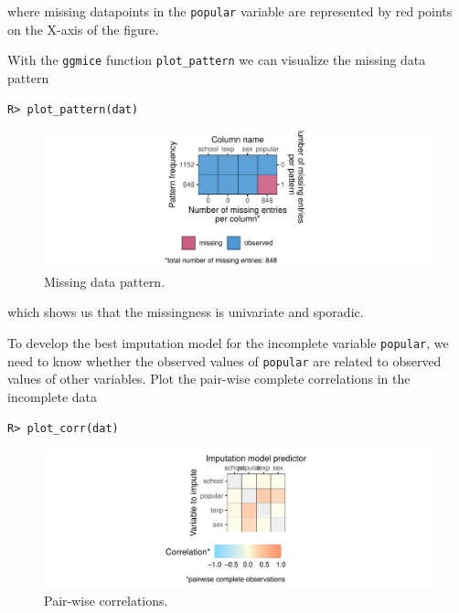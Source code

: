 \documentclass[
  article]{jss}
\begin{document}
where missing datapoints in the \texttt{popular} variable are
represented by red points on the X-axis of the figure.

With the \texttt{ggmice} function \texttt{plot\_pattern} we can
visualize the missing data pattern

\begin{verbatim}
R> plot_pattern(dat)
\end{verbatim}

\begin{figure}[h]

{\centering \includegraphics{manuscript_files/figure-pdf/fig-pattern-1.pdf}

}

\caption{\label{fig-pattern}Missing data pattern.}

\end{figure}

which shows us that the missingness is univariate and sporadic.

To develop the best imputation model for the incomplete variable
\texttt{popular}, we need to know whether the observed values of
\texttt{popular} are related to observed values of other variables. Plot
the pair-wise complete correlations in the incomplete data

\begin{verbatim}
R> plot_corr(dat)
\end{verbatim}

\begin{figure}[h]

{\centering \includegraphics{manuscript_files/figure-pdf/unnamed-chunk-10-1.pdf}

}

\caption{Pair-wise correlations.}

\end{figure}
\end{document}
